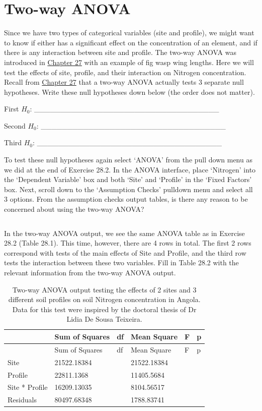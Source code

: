 \documentclass[
  openany]{scrbook}
\begin{document}
\hypertarget{two-way-anova}{%
\section{Two-way ANOVA}\label{two-way-anova}}

Since we have two types of categorical variables (site and profile), we might want to know if either has a significant effect on the concentration of an element, and if there is any interaction between site and profile.
The two-way ANOVA was introduced in \protect\hyperlink{Chapter_27}{Chapter 27} with an example of fig wasp wing lengths.
Here we will test the effects of site, profile, and their interaction on Nitrogen concentration.
Recall from \protect\hyperlink{Chapter_27}{Chapter 27} that a two-way ANOVA actually tests 3 separate null hypotheses.
Write these null hypotheses down below (the order does not matter).

First \(H_{0}\): \_\_\_\_\_\_\_\_\_\_\_\_\_\_\_\_\_\_\_\_\_\_\_\_\_\_\_\_\_\_\_\_\_\_\_

Second \(H_{0}\): \_\_\_\_\_\_\_\_\_\_\_\_\_\_\_\_\_\_\_\_\_\_\_\_\_\_\_\_\_\_\_\_\_\_\_

Third \(H_{0}\): \_\_\_\_\_\_\_\_\_\_\_\_\_\_\_\_\_\_\_\_\_\_\_\_\_\_\_\_\_\_\_\_\_\_\_

To test these null hypotheses again select `ANOVA' from the pull down menu as we did at the end of Exercise 28.2.
In the ANOVA interface, place `Nitrogen' into the `Dependent Variable' box and both `Site' and `Profile' in the `Fixed Factors' box.
Next, scroll down to the `Assumption Checks' pulldown menu and select all 3 options.
From the assumption checks output tables, is there any reason to be concerned about using the two-way ANOVA?

\begin{verbatim}
\end{verbatim}

In the two-way ANOVA output, we see the same ANOVA table as in Exercise 28.2 (Table 28.1).
This time, however, there are 4 rows in total.
The first 2 rows correspond with tests of the main effects of Site and Profile, and the third row tests the interaction between these two variables.
Fill in Table 28.2 with the relevant information from the two-way ANOVA output.

\begin{longtable}[]{@{}llllll@{}}
\caption{\label{tab:unnamed-chunk-115}Two-way ANOVA output testing the effects of 2 sites and 3 different soil profiles on soil Nitrogen concentration in Angola. Data for this test were inspired by the doctoral thesis of Dr Lidia De Sousa Teixeira.}\tabularnewline
\toprule
& Sum of Squares & df & Mean Square & F & p \\
\midrule
\endfirsthead
\toprule
& Sum of Squares & df & Mean Square & F & p \\
\midrule
\endhead
Site & 21522.18384 & & 21522.18384 & & \\
Profile & 22811.1368 & & 11405.5684 & & \\
Site * Profile & 16209.13035 & & 8104.56517 & & \\
Residuals & 80497.68348 & & 1788.83741 & & \\
\bottomrule
\end{longtable}
\end{document}
